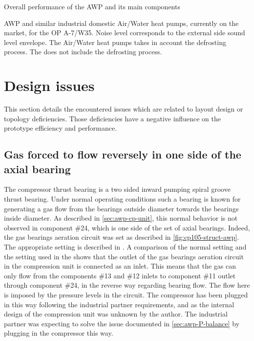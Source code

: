 \begin{table}[htbp]
  \begin{center}
    \footnotesize
    
  \end{center}
  \caption{Overall performance of the AWP and its main components}
  \label{tab:awp-performances-summary}
\end{table}

\begin{table}[htbp]
  \begin{center}
    \footnotesize
    
  \end{center}
  \caption[AWP and similar industrial domestic heat pumps coefficient
  of performance]{AWP and similar industrial domestic Air/Water heat
    pumps, currently on the market, \COP{} for the
    OP A-7/W35. Noise level corresponds to the external side sound
    level envelope. The Air/Water heat pumps \COP{} takes in account
    the defrosting process. The \AWP{} \COP{} does not include the
    defrosting process.}
  \label{tab:awp-indus-products-comparison}
\end{table}

\section{Design issues}
\label{sec:awp-design-issues}

This section details the encountered issues which are related to
\AWP{} layout design or topology deficiencies. Those deficiencies have
a negative influence on the prototype efficiency and performance.


\subsection{Gas forced to flow reversely in one side of
  the axial bearing}
\label{sec:axial-is-reversed}

The compressor thrust bearing is a two sided inward pumping spiral
groove thrust bearing. Under normal operating conditions such a
bearing is known for generating a gas flow from the bearings outside
diameter towards the bearings inside diameter. As described in
\cref{sec:awp-cp-unit}, this normal behavior is not observed in
component \#24, which is one side of the set of axial
bearings. Indeed, the gas bearings aeration circuit was set as
described in \cref{fig:cp105-struct-awp}. The appropriate setting is
described in . A comparison of the normal
setting and the setting used in the \AWP{} shows that the outlet of
the gas bearings aeration circuit in the compression unit is connected
as an inlet. This means that the gas can only flow from the components
\#13 and \#12 inlets to component \#11 outlet through component \#24,
in the reverse way regarding bearing flow. The flow here is imposed by
the pressure levels in the circuit. The compressor has been plugged in
this way following the industrial partner requirements, and as the
internal design of the compression unit was unknown by the author. The
industrial partner was expecting to solve the issue documented in
\cref{sec:awp-P-balance} by plugging in the compressor this way.

